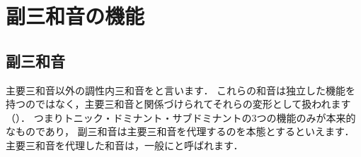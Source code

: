 \documentclass[dvipdfmx,uplatex,b5paper,openany,jbase=12Q,nomag*,textwidth-limit=44%
               ]{gachimuchi}
\begin{document}
\section{副三和音の機能}
\subsection{副三和音}
主要三和音以外の調性内三和音をと言います．%
これらの和音は独立した機能を持つのではなく，主要三和音と関係づけられてそれらの変形として扱われます
（）．
つまりトニック・ドミナント・サブドミナントの3つの機能のみが本来的なものであり，
副三和音は主要三和音を代理するのを本態とするといえます．
主要三和音を代理した和音は，一般にと呼ばれます．
\end{document}
